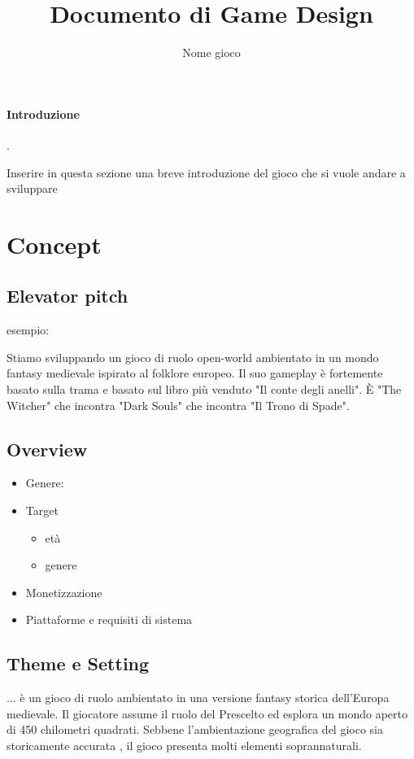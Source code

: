 \documentclass{report}
\title{Documento di Game Design}
\author{Nome gioco}
\begin{document}
\maketitle

\paragraph{Introduzione} .\par
Inserire in questa sezione una breve introduzione del gioco che si vuole andare a sviluppare


\section{Concept}

\subsection{Elevator pitch}

esempio:

Stiamo sviluppando un gioco di ruolo open-world ambientato in un mondo fantasy medievale ispirato al folklore europeo. Il suo gameplay è fortemente basato sulla trama e basato sul libro più venduto "Il conte degli anelli". È "The Witcher" che incontra "Dark Souls" che incontra "Il Trono di Spade".

\subsection{Overview}
\begin{itemize}
  \item Genere: 
  \item Target
  \begin{itemize}
    \item età
    \item genere
  \end{itemize}
  \item Monetizzazione
  \item Piattaforme e requisiti di sistema
\end{itemize}

\subsection{Theme e Setting}

 ... è un gioco di ruolo ambientato in una versione fantasy storica dell'Europa medievale. Il giocatore assume il ruolo del Prescelto ed esplora un mondo aperto di 450 chilometri quadrati. Sebbene l'ambientazione geografica del gioco sia storicamente accurata , il gioco presenta molti elementi soprannaturali.
\end{document}
